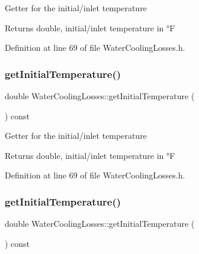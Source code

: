 Getter for the initial/inlet temperature

\begin{DoxyReturn}{Returns}
double, initial/inlet temperature in °F 
\end{DoxyReturn}


Definition at line 69 of file Water\+Cooling\+Losses.\+h.

\mbox{\label{class_water_cooling_losses_a205b469029ec9cd4d792169bf8589f24}} 
\subsubsection{\texorpdfstring{get\+Initial\+Temperature()}{getInitialTemperature()}\hspace{0.1cm}{\footnotesize\ttfamily [2/3]}}
{\footnotesize\ttfamily double Water\+Cooling\+Losses\+::get\+Initial\+Temperature (\begin{DoxyParamCaption}{ }\end{DoxyParamCaption}) const\hspace{0.3cm}{\ttfamily [inline]}}

Getter for the initial/inlet temperature

\begin{DoxyReturn}{Returns}
double, initial/inlet temperature in °F 
\end{DoxyReturn}


Definition at line 69 of file Water\+Cooling\+Losses.\+h.

\mbox{\label{class_water_cooling_losses_a205b469029ec9cd4d792169bf8589f24}} 
\subsubsection{\texorpdfstring{get\+Initial\+Temperature()}{getInitialTemperature()}\hspace{0.1cm}{\footnotesize\ttfamily [3/3]}}
{\footnotesize\ttfamily double Water\+Cooling\+Losses\+::get\+Initial\+Temperature (\begin{DoxyParamCaption}{ }\end{DoxyParamCaption}) const\hspace{0.3cm}{\ttfamily [inline]}}

